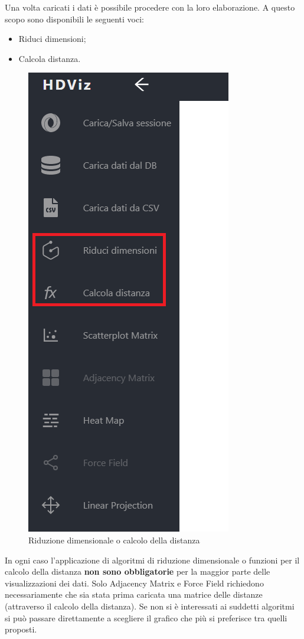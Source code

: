 \newpage
Una volta caricati i dati è possibile procedere con la loro elaborazione. A questo scopo sono disponibili le seguenti voci:

\begin{itemize}
	\item Riduci dimensioni;
	\item Calcola distanza.
\end{itemize}

\begin{figure}[H]
		\includegraphics[scale=0.6]{Images/SceltaAlgoritmi.png}
		\centering
		\caption{Riduzione dimensionale o calcolo della distanza}
\end{figure}

In ogni caso l'applicazione di algoritmi di riduzione dimensionale o funzioni per il calcolo della distanza \textbf{non sono obbligatorie} per la maggior parte delle visualizzazioni dei dati. Solo Adjacency Matrix e Force Field richiedono necessariamente che sia stata prima caricata una matrice delle distanze (attraverso il calcolo della distanza). Se non si è interessati ai suddetti algoritmi si può passare direttamente a scegliere il grafico che più si preferisce tra quelli proposti.

